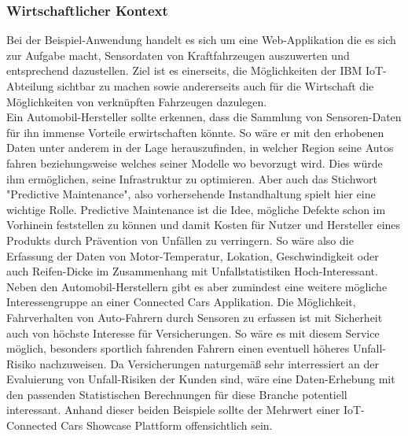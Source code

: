 \documentclass[12pt,a4paper,oneside, 
liststotoc, 					%
bibtotoc,						%
titlepage, 						%
headsepline, 					%
BCOR6mm,						%
openany,							%
]{scrreprt}
\begin{document}
\subsubsection{Wirtschaftlicher Kontext}\label{context_business}
Bei der Beispiel-Anwendung handelt es sich um eine Web-Applikation die es sich zur Aufgabe macht, Sensordaten von Kraftfahrzeugen auszuwerten und entsprechend dazustellen. Ziel ist es einerseits, die Möglichkeiten der IBM IoT-Abteilung sichtbar zu machen sowie andererseits auch für die Wirtschaft die Möglichkeiten von verknüpften Fahrzeugen dazulegen.\\
Ein Automobil-Hersteller sollte erkennen, dass die Sammlung von Sensoren-Daten für ihn immense Vorteile erwirtschaften könnte. So wäre er mit den erhobenen Daten unter anderem in der Lage herauszufinden, in welcher Region seine Autos fahren beziehungsweise welches seiner Modelle wo bevorzugt wird. Dies würde ihm ermöglichen, seine Infrastruktur zu optimieren. Aber auch das Stichwort "Predictive Maintenance", also vorhersehende Instandhaltung spielt hier eine wichtige Rolle. Predictive Maintenance ist die Idee, mögliche Defekte schon im Vorhinein feststellen zu können und damit Kosten für Nutzer und Hersteller eines Produkts durch Prävention von Unfällen zu verringern. So wäre also die Erfassung der Daten von Motor-Temperatur, Lokation, Geschwindigkeit oder auch Reifen-Dicke im Zusammenhang mit Unfallstatistiken Hoch-Interessant. Neben den Automobil-Herstellern gibt es aber zumindest eine weitere mögliche Interessengruppe an einer Connected Cars Applikation. Die Möglichkeit, Fahrverhalten von Auto-Fahrern durch Sensoren zu erfassen ist mit Sicherheit auch von höchste Interesse für Versicherungen. So wäre es mit diesem Service möglich, besonders sportlich fahrenden Fahrern einen eventuell höheres Unfall-Risiko nachzuweisen. Da Versicherungen naturgemäß sehr interressiert an der Evaluierung von Unfall-Risiken der Kunden sind, wäre eine Daten-Erhebung mit den passenden Statistischen Berechnungen für diese Branche potentiell interessant. Anhand dieser beiden Beispiele sollte der Mehrwert einer IoT-Connected Cars Showcase Plattform offensichtlich sein.
\end{document}
